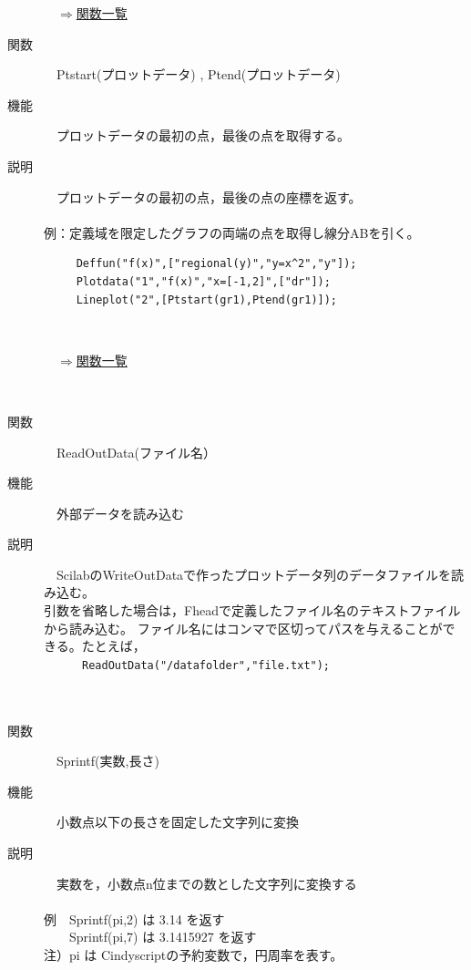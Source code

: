 \documentclass[papersize,a4paper,12pt,uplatex]{jsarticle}
\begin{document}
\begin{description}
\begin{flushright}　\hyperlink{functionlist}{$\Rightarrow$関数一覧}\end{flushright}

\hypertarget{ptstart}{}
\item[関数]　Ptstart(プロットデータ) , Ptend(プロットデータ)
\item[機能]　プロットデータの最初の点，最後の点を取得する。
\item[説明]　プロットデータの最初の点，最後の点の座標を返す。\\
　\\
例：定義域を限定したグラフの両端の点を取得し線分ABを引く。\\
\begin{verbatim}
　　　Deffun("f(x)",["regional(y)","y=x^2","y"]); 
　　　Plotdata("1","f(x)","x=[-1,2]",["dr"]);
　　　Lineplot("2",[Ptstart(gr1),Ptend(gr1)]);
\end{verbatim}
          　　　　\\
\begin{flushright}　\hyperlink{functionlist}{$\Rightarrow$関数一覧}\end{flushright}

　\\

\hypertarget{readoutdata}{}
\item[関数]　ReadOutData(ファイル名）
\item[機能]　外部データを読み込む
\item[説明]　ScilabのWriteOutDataで作ったプロットデータ列のデータファイルを読み込む。\\
引数を省略した場合は，Fheadで定義したファイル名のテキストファイルから読み込む。
ファイル名にはコンマで区切ってパスを与えることができる。たとえば，\\
　　　\verb|ReadOutData("/datafolder","file.txt"); |\\
　\\
　\\
\hypertarget{sprintf}{}
\item[関数]　Sprintf(実数,長さ)
\item[機能]　小数点以下の長さを固定した文字列に変換
\item[説明]　実数を，小数点n位までの数とした文字列に変換する\\
　\\
例　Sprintf(pi,2) は 3.14 を返す\\
　　Sprintf(pi,7) は 3.1415927 を返す\\
注）pi は Cindyscriptの予約変数で，円周率を表す。　\\


\end{description}
\end{document}
